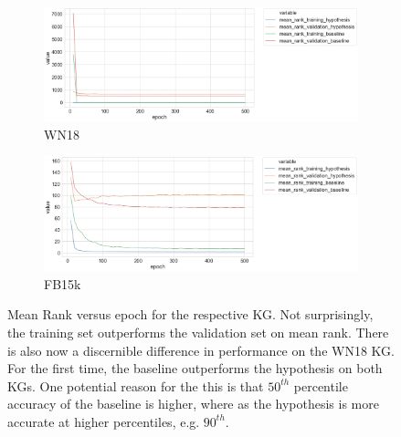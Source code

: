 
\begin{figure}[H]
	\begin{subfigure}[b]{.5\linewidth}
   		\centering
    		\includegraphics[width=1.0\linewidth, height=0.6\linewidth]{WN18_mean_rank_Results}
		\captionsetup{justification=centering}
		\caption{WN18}
	\end{subfigure}
	\begin{subfigure}[b]{.5\linewidth}
   		\centering
		\includegraphics[width=1.0\linewidth, height=0.6\linewidth]{FB15k_mean_rank_Results}
		\captionsetup{justification=centering}
		\caption{FB15k}
	\end{subfigure}
	\captionsetup{justification=centering}
	\caption{Mean Rank versus epoch for the respective KG. Not surprisingly, the training set outperforms the validation set on mean rank. There is also now a discernible difference in performance on the WN18 KG. For the first time, the baseline outperforms the hypothesis on both KGs. One potential reason for the this is that $ 50^{th} $ percentile accuracy of the baseline is higher, where as the hypothesis is more accurate at higher percentiles, e.g. $ 90^{th} $.}
\end{figure}


